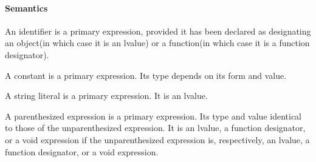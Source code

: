 \documentclass{article}
\begin{document}
\paragraph*{Semantics}
An identifier is a primary expression, provided it has been declared as designating an 
object(in which case it is an lvalue) or a function(in which case it is a function 
designator).
\linebreak

A constant is a primary expression. Its type depends on its form and value.
\linebreak

A string literal is a primary expression.  It is an lvalue.
\linebreak

A parenthesized expression is a primary expression.  Its type and value identical to 
those of the unparenthesized expression.  It is an lvalue, a function designator, or a 
void expression if the unparenthesized expression is, respectively, an lvalue, a 
function designator, or a void expression.



\end{document}
